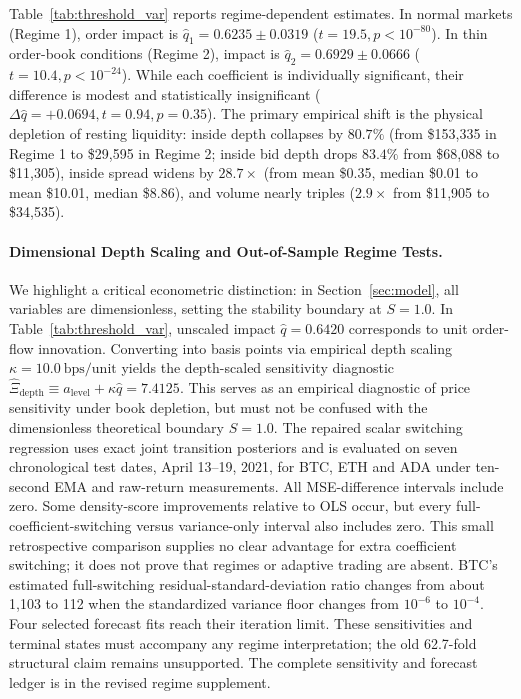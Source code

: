 \documentclass[12pt]{article}
\theoremstyle{definition}
\theoremstyle{remark}
\begin{document}
Table~\ref{tab:threshold_var} reports regime-dependent estimates. In normal markets (Regime 1), order impact is $\hat{q}_1 = 0.6235 \pm 0.0319$ ($t = 19.5, p < 10^{-80}$). In thin order-book conditions (Regime 2), impact is $\hat{q}_2 = 0.6929 \pm 0.0666$ ($t = 10.4, p < 10^{-24}$). While each coefficient is individually significant, their difference is modest and statistically insignificant ($\Delta \hat{q} = +0.0694, t = 0.94, p = 0.35$). The primary empirical shift is the physical depletion of resting liquidity: inside depth collapses by $80.7\%$ (from \$153{,}335 in Regime 1 to \$29{,}595 in Regime 2; inside bid depth drops $83.4\%$ from \$68{,}088 to \$11{,}305), inside spread widens by $28.7\times$ (from mean \$0.35, median \$0.01 to mean \$10.01, median \$8.86), and volume nearly triples ($2.9\times$ from \$11{,}905 to \$34{,}535).

\paragraph{Dimensional Depth Scaling and Out-of-Sample Regime Tests.}
We highlight a critical econometric distinction: in Section~\ref{sec:model}, all variables are dimensionless, setting the stability boundary at $S = 1.0$. In Table~\ref{tab:threshold_var}, unscaled impact $\hat{q} = 0.6420$ corresponds to unit order-flow innovation. Converting into basis points via empirical depth scaling $\kappa = 10.0~\text{bps}/\text{unit}$ yields the depth-scaled sensitivity diagnostic $\hat{\Xi}_{\text{depth}} \equiv a_{\text{level}} + \kappa \hat{q} = 7.4125$. This serves as an empirical diagnostic of price sensitivity under book depletion, but must not be confused with the dimensionless theoretical boundary $S = 1.0$. The repaired scalar switching regression uses exact joint transition posteriors and is evaluated on seven chronological test dates, April 13--19, 2021, for BTC, ETH and ADA under ten-second EMA and raw-return measurements. All MSE-difference intervals include zero. Some density-score improvements relative to OLS occur, but every full-coefficient-switching versus variance-only interval also includes zero. This small retrospective comparison supplies no clear advantage for extra coefficient switching; it does not prove that regimes or adaptive trading are absent. BTC's estimated full-switching residual-standard-deviation ratio changes from about 1,103 to 112 when the standardized variance floor changes from $10^{-6}$ to $10^{-4}$. Four selected forecast fits reach their iteration limit. These sensitivities and terminal states must accompany any regime interpretation; the old 62.7-fold structural claim remains unsupported. The complete sensitivity and forecast ledger is in the revised regime supplement.
\end{document}
